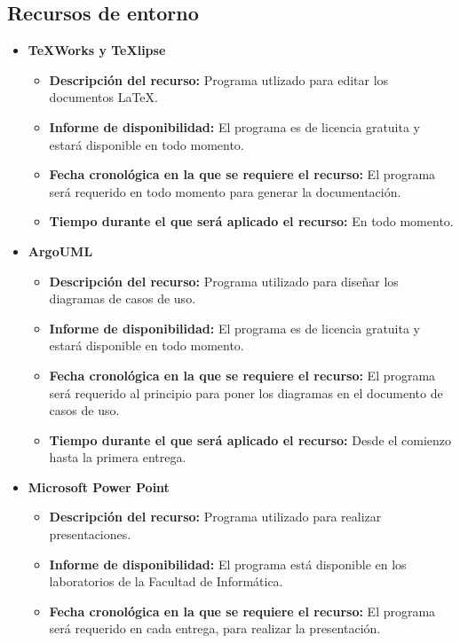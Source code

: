\documentclass[spanish,a4paper,12pt]{report}	%
\begin{document}
		\subsection*{Recursos de entorno}
			\begin{itemize}
				  \item \textbf{TeXWorks y TeXlipse}
				  	\begin{itemize}
				  	  \item \textbf{Descripción del recurso: } Programa utlizado para editar los documentos \LaTeX.
				  	  \item \textbf{Informe de disponibilidad: }El programa es de licencia gratuita y estará disponible en 
				  	  			todo momento.
				  	  \item \textbf{Fecha cronológica en la que se requiere el recurso: }El programa será requerido en todo 
				  	  				momento para generar la documentación.
				  	  \item \textbf{Tiempo durante el que será aplicado el recurso: }En todo momento. 
					\end{itemize}
				\item \textbf{ArgoUML}
				  	\begin{itemize}
				  	  \item \textbf{Descripción del recurso: } Programa utilizado para diseñar los diagramas de casos de uso.
				  	  \item \textbf{Informe de disponibilidad: }El programa es de licencia gratuita y estará disponible en 
				  	  			todo momento.
				  	  \item \textbf{Fecha cronológica en la que se requiere el recurso: }El programa será requerido al
				  	  			principio para poner los diagramas en el documento de casos de uso.
				  	  \item \textbf{Tiempo durante el que será aplicado el recurso: }Desde el comienzo hasta la primera entrega. 
					\end{itemize}
				\item \textbf{Microsoft Power Point}
				  	\begin{itemize}
				  	  \item \textbf{Descripción del recurso: } Programa utilizado para realizar presentaciones.
				  	  \item \textbf{Informe de disponibilidad: }El programa está disponible en los laboratorios de la Facultad de Informática.
				  	  \item \textbf{Fecha cronológica en la que se requiere el recurso: }El programa será requerido en cada entrega, para realizar la presentación.

\end{itemize}
\end{itemize}
\end{document}
